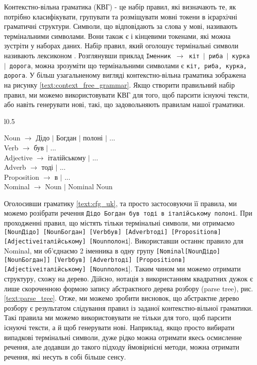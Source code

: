 Контекстно-вільна граматика (КВГ) - це набір правил, які визначають те, як потрібно класифікувати,
групувати та розміщувати мовні токени в ієрархічні граматичні структури. Символи, що
відповідають за слова у мові, називають термінальними символами. Вони також є і кінцевими
токенами, які можна зустріти у наборах даних. Набір правил, який оголошує термінальні
символи називають лексиконом \cite{bib5}. Розглянувши приклад
\texttt{Іменник~$\rightarrow$~кіт~$\mid$~риба~$\mid$~курка~$\mid$~дорога}, можна зрозуміти
що термінальними символами є \texttt{кіт, риба, курка, дорога}. У більш узагальненому
вигляді контекстно-вільна граматика зображена на рисунку \ref{text:context_free_grammar}.
Якщо створити правильний набір правил, ми можемо використовувати КВГ для того, щоб парсити
існуючі тексти, або навіть генерувати нові, такі, що задовольняють правилам нашої граматики.

\begin{wrapfigure}{l}{0.5\textwidth}
  \begin{flushleft}
    \noindent Noun $\rightarrow$ Дідо $\mid$ Богдан $\mid$ полоні $\mid$ ... \\
    \noindent Verb $\rightarrow$ був $\mid$ ...\\
    \noindent Adjective $\rightarrow$ італійському $\mid$ ... \\
    \noindent Adverb $\rightarrow$ тоді $\mid$ ... \\
    \noindent Proposition $\rightarrow$ в $\mid$ ... \\
    \noindent Nominal $\rightarrow$ Noun $\mid$ Nominal Noun \\
  \end{flushleft}
  \caption{Задана КВГ}
  \label{text:cfg_uk}
\end{wrapfigure}

Оголосивши граматику \ref{text:cfg_uk}, та просто застосовуючи її правила,
ми можемо розібрати речення \texttt{Дідо Богдан був тоді в італійському полоні}.
При проходженні правил, що містять тільки термінальні символи, ми отримаємо
\texttt{[{\footnotesize Noun}Дідо] [{\footnotesize Noun}Богдан] 
[{\footnotesize Verb}був] [{\footnotesize Adverb}тоді]
[{\footnotesize Proposition}в] [{\footnotesize Adjective}італійському]
[{\footnotesize Noun}полоні}]. Використавши останнє правило для Nominal, ми об'єднаємо
2 іменника в одну групу 
\texttt{[{\footnotesize Nominal}[{\footnotesize Noun}Дідо][{\footnotesize Noun}Богдан]]
[{\footnotesize Verb}був] [{\footnotesize Adverb}тоді] [{\footnotesize Proposition}в]
[{\footnotesize Adjective}італійському] [{\footnotesize Noun}полоні}].
Таким чином ми можемо отримати структуру, схожу на дерево. Дійсно, нотація з використанням
квадратних дужок є лише скороченною формою запису
абстрактного дерева розбору (parse tree), рис. \ref{text:parse_tree}.
Отже, ми можемо зробити висновок, що абстрактне дерево розбору є результатом слідування
правил із заданої контекстно-вільної граматики. Такі правила ми можемо використовувати не
тільки для того, щоб парсити існуючі тексти, а й щоб генерувати нові. Наприклад, якщо
просто вибирати випадкові термінальні символи, дуже рідко можна отримати якесь осмисленне
речення, але додавши до такого підходу ймовірнісні методи, можна отримати речення, які
несуть в собі більше сенсу.

